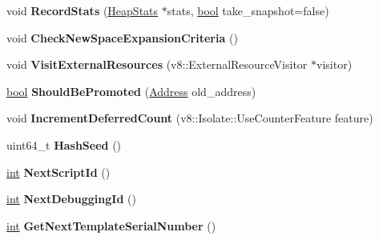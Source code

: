 \begin{DoxyCompactItemize}
\mbox{\label{classv8_1_1internal_1_1Heap_aade3e6bd0abbe091c12e9c9ac35ee6af}} 
void {\bfseries Record\+Stats} (\mbox{\hyperlink{classv8_1_1internal_1_1HeapStats}{Heap\+Stats}} $\ast$stats, \mbox{\hyperlink{classbool}{bool}} take\+\_\+snapshot=false)
\item 
\mbox{\label{classv8_1_1internal_1_1Heap_a432276c83ffc010c9d21b3ae4ab8ec1b}} 
void {\bfseries Check\+New\+Space\+Expansion\+Criteria} ()
\item 
\mbox{\label{classv8_1_1internal_1_1Heap_a1114f7d55a1658f321e1aaebc34ee3f4}} 
void {\bfseries Visit\+External\+Resources} (v8\+::\+External\+Resource\+Visitor $\ast$visitor)
\item 
\mbox{\label{classv8_1_1internal_1_1Heap_a660ab0472fc14e40907b7c48e03f75f3}} 
\mbox{\hyperlink{classbool}{bool}} {\bfseries Should\+Be\+Promoted} (\mbox{\hyperlink{classuintptr__t}{Address}} old\+\_\+address)
\item 
\mbox{\label{classv8_1_1internal_1_1Heap_a1f23e013cea83a3fdcf17b9019c811e1}} 
void {\bfseries Increment\+Deferred\+Count} (v8\+::\+Isolate\+::\+Use\+Counter\+Feature feature)
\item 
\mbox{\label{classv8_1_1internal_1_1Heap_a88f7d0c662e6979a6a6096e9b5fa36d2}} 
uint64\+\_\+t {\bfseries Hash\+Seed} ()
\item 
\mbox{\label{classv8_1_1internal_1_1Heap_a4cd0eb7bcdbdc35990732b983923a67a}} 
\mbox{\hyperlink{classint}{int}} {\bfseries Next\+Script\+Id} ()
\item 
\mbox{\label{classv8_1_1internal_1_1Heap_af4d43bc833d08237d83957f06403a728}} 
\mbox{\hyperlink{classint}{int}} {\bfseries Next\+Debugging\+Id} ()
\item 
\mbox{\label{classv8_1_1internal_1_1Heap_ac290bf56875fc5a8745ef7cb7b8f3b49}} 
\mbox{\hyperlink{classint}{int}} {\bfseries Get\+Next\+Template\+Serial\+Number} ()
\item 

\end{DoxyCompactItemize}
